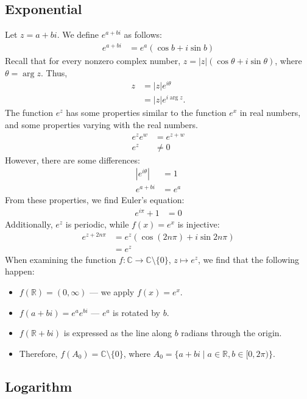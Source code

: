 \documentclass[10pt]{extarticle}
\newcommand{\R}{\mathbb{R}}
\newcommand{\C}{\mathbb{C}}
\begin{document}
  \subsection{Exponential}%
  Let $z = a+bi$. We define $e^{a+bi}$ as follows:
  \begin{align*}
    e^{a+bi} &= e^a \left(\cos b + i\sin b\right)
  \end{align*}
  Recall that for every nonzero complex number, $z = |z|\left(\cos \theta + i\sin\theta\right)$, where $\theta = \arg z$. Thus,
  \begin{align*}
    z &= |z|e^{i\theta}\\
      &= |z|e^{i\arg z}.
  \end{align*}
  The function $e^z$ has some properties similar to the function $e^x$ in real numbers, and some properties varying with the real numbers.
  \begin{align*}
    e^ze^w &= e^{z+w}\\
    e^z &\neq 0
  \end{align*}
  However, there are some differences:
  \begin{align*}
    |e^{i\theta}| &= 1 \tag*{$\forall \theta$}\\
    e^{a+bi} &= e^a
  \end{align*}
  From these properties, we find Euler's equation:
  \begin{align*}
    e^{i\pi} + 1 &= 0
  \end{align*}
  Additionally, $e^z$ is periodic, while $f(x) = e^x$ is injective:
  \begin{align*}
    e^{z + 2n\pi} &= e^{z}\left(\cos(2n\pi) + i\sin{2n\pi}\right)\\
                  &= e^z
  \end{align*}
  When examining the function $f: \C\rightarrow\C\setminus\{0\}$, $z \mapsto e^z$, we find that the following happen:
  \begin{itemize}
    \item $f(\R) = (0,\infty)$ --- we apply $f(x) = e^x$.
    \item $f(a+bi) = e^ae^{bi}$ --- $e^a$ is rotated by $b$.
    \item $f(\R + bi)$ is expressed as the line along $b$ radians through the origin.
    \item Therefore, $f(A_0) = \C\setminus\{0\}$, where $A_0 = \{a+bi\mid a\in \R, b\in [0,2\pi)\}$.
  \end{itemize}
  \subsection{Logarithm}%
  
\end{document}
